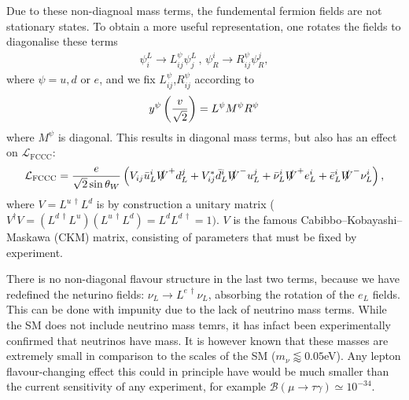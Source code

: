 Due to these non-diagnoal mass terms, the fundemental fermion fields are not stationary states. To obtain a more useful representation, one rotates the fields to diagonalise these terms
\begin{align}
  \psi^L_i\to L^{\psi}_{ij} \psi^L_j \,,\, \psi_R^i \to R^{\psi}_{ij} \psi_R^j,
\end{align}
where $\psi=u,d$ or $e$, and we fix $L^{\psi}_{ij}$,$R^{\psi}_{ij}$ according to
\begin{align}
  y^{\psi} \left({v\over \sqrt{2}}\right)= L^{\psi} M^{\psi} R^{\psi}
\end{align}
where $M^{\psi}$ is diagonal. This results in diagonal mass terms, but also has an effect on $\mathcal{L}_{\text{FCCC}}$:
\begin{align}
  \mathcal{L}_{\text{FCCC}} = {e\over \sqrt{2}\sin\theta_W} \left( V_{ij} \bar{u}_L^i \slashed{W}^+  d_L^j + V_{ij}^* \bar{d}_L^i \slashed{W}^- u_L^j + \bar{\nu}_L^i \slashed{W}^+ e_L^i + \bar{e}_L^i \slashed{W}^- \nu_L^i \right),
  \label{eq:FCCC}
\end{align}
where $V = L^{u\,\dagger} L^d$ is by construction a unitary matrix ($V^{\dagger}V = (L^{d\,\dagger} L^u)(L^{u\,\dagger} L^d) = L^d L^{d\,\dagger} = 1)$. $V$ is the famous Cabibbo–Kobayashi–Maskawa (CKM) matrix, consisting of parameters that must be fixed by experiment.

There is no non-diagonal flavour structure in the last two terms, because we have redefined the neturino fields: $\nu_L \to L^{e\,\dagger} \nu_L$, absorbing the rotation of the $e_L$ fields. This can be done with impunity due to the lack of neutrino mass terms. While the SM does not include neutrino mass temrs, it has infact been experimentally confirmed that neutrinos have mass. It is however known that these masses are extremely small in comparison to the scales of the SM ($m_{\nu}\lessapprox 0.05$eV). Any lepton flavour-changing effect this could in principle have would be much smaller than the current sensitivity of any experiment, for example $\mathcal{B}(\mu\to \tau \gamma) \simeq 10^{-34}$.

